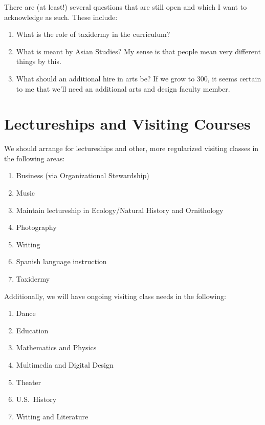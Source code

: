 \documentclass[12pt]{article}
\begin{document}
There are (at least!) several questions that are still open and which
I want to acknowledge as such.  These include:

\begin{enumerate}

\item What is the role of taxidermy in the curriculum?

\item What is meant by Asian Studies?  My sense is that people mean
very different things by this.  

\item What should an additional hire in arts be?  If we grow to 300,
it seems certain to me that we'll need an additional arts and design
faculty member.

\end{enumerate}



\section{Lectureships and Visiting Courses}
\label{lectureships}

We should arrange for lectureships and other, more regularized
visiting classes in the following areas:

\begin{enumerate}
\setlength{\itemsep}{-1mm}
    \item Business (via Organizational Stewardship)
    \item Music
    \item Maintain lectureship in Ecology/Natural History and
    Ornithology 
    \item Photography
    \item Writing
    \item Spanish language instruction
    \item Taxidermy
\end{enumerate}

Additionally, we will have ongoing visiting class needs in the
following:
\begin{enumerate}
\setlength{\itemsep}{-1mm}
    \item Dance
    \item Education
    \item Mathematics and Physics 
    \item Multimedia and Digital Design
    \item Theater
    \item U.S.~History
    \item Writing and Literature
\end{enumerate}
\end{document}
